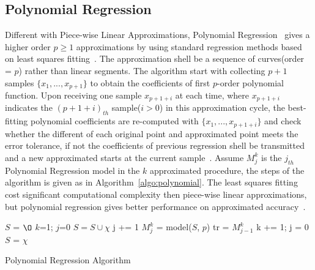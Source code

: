 \subsection{Polynomial Regression}
Different with Piece-wise Linear Approximations, Polynomial
Regression~\cite{2014zordan2014performance} gives a higher order $p \geqslant1$
approximations by using standard regression methods based on least squares
fitting~\cite{phillips2003interpolation}. The approximation shell be a sequence
of curves(order = $p$) rather than linear segments. The algorithm start with
collecting $p+1$ samples $\{x_1, ..., x_{p+1} \}$ to obtain the coefficients of
first $p$-order polynomial function. Upon receiving one sample $x_{p+1+i}$ at
each time, where $x_{p+1+i}$ indicates the $(p+1+i)_{th}$ sample($i>0$) in this
approximation cycle, the best-fitting polynomial coefficients are re-computed
with $\{ x_1, ..., x_{p+1+i}\}$ and check whether the different of each original
point and approximated point meets the error tolerance, if not the coefficients
of previous regression shell be transmitted and a new approximated starts at the
current sample~\cite{2014zordan2014performance}. Assume $M_j^k$ is the $j_{th}$
Polynomial Regression model in the $k$ approximated procedure, the steps of the
algorithm is given as in Algorithm~\ref{algo:polynomial}. The least squares
fitting cost significant computational complexity then piece-wise linear
approximations, but polynomial regression gives better performance on
approximated accuracy~\cite{2014zordan2014performance}.

\begin{algorithm}
\begin{algorithmic}[1]
\Input
\EndInput
\Output
\EndOutput

\State $S$ = $\O$
\State $k$=1; $j$=0
    \State $S = S \cup \chi$
        \State j += 1
        \State $M_j^k$ = model($S$, $p$)    
           
                \State tr = $M_{j-1}^k$ 
                \State k += 1; j = 0
                \State $S$ = $\chi$
            \EndIf
        \EndFor
    \EndIf
\EndWhile
\end{algorithmic}
\caption{Polynomial Regression Algorithm}
\label{algo:polynomial}
\end{algorithm}



